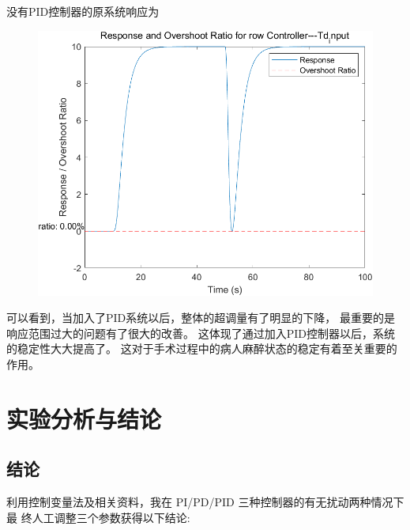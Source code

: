 \documentclass{thuemp}
\begin{document}
没有PID控制器的原系统响应为
\begin{figure}[H]
\centering
\includegraphics[width=0.8\linewidth]{./img/None_p3_Td.png}
\end{figure}
可以看到，当加入了PID系统以后，整体的超调量有了明显的下降，
最重要的是响应范围过大的问题有了很大的改善。
这体现了通过加入PID控制器以后，系统的稳定性大大提高了。
这对于手术过程中的病人麻醉状态的稳定有着至关重要的作用。


\section{实验分析与结论}
\subsection{结论}
利用控制变量法及相关资料，我在
PI/PD/PID 三种控制器的有无扰动两种情况下最
终人工调整三个参数获得以下结论:

\begin{table}[!ht]
  \centering
  \captionnamefont{\wuhao\bf\heiti}
  \captiontitlefont{\wuhao\bf\heiti}
  \caption{PID参数对系统的影响} 
\end{table}
\end{document}
